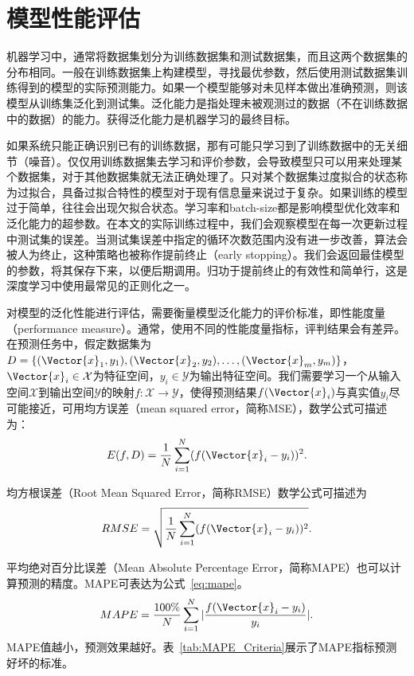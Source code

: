 \section{模型性能评估}


机器学习中，通常将数据集划分为训练数据集和测试数据集，而且这两个数据集的分布相同。一般在训练数据集上构建模型，寻找最优参数，然后使用测试数据集训练得到的模型的实际预测能力。如果一个模型能够对未见样本做出准确预测，则该模型从训练集泛化到测试集。泛化能力是指处理未被观测过的数据（不在训练数据中的数据）的能力。获得泛化能力是机器学习的最终目标。

如果系统只能正确识别已有的训练数据，那有可能只学习到了训练数据中的无关细节（噪音）。仅仅用训练数据集去学习和评价参数，会导致模型只可以用来处理某个数据集，对于其他数据集就无法正确处理了。只对某个数据集过度拟合的状态称为过拟合，具备过拟合特性的模型对于现有信息量来说过于复杂。如果训练的模型过于简单，往往会出现欠拟合状态。学习率和batch-size都是影响模型优化效率和泛化能力的超参数。在本文的实际训练过程中，我们会观察模型在每一次更新过程中测试集的误差。当测试集误差中指定的循环次数范围内没有进一步改善，算法会被人为终止，这种策略也被称作提前终止（early stopping）。我们会返回最佳模型的参数，将其保存下来，以便后期调用。归功于提前终止的有效性和简单行，这是深度学习中使用最常见的正则化之一。

对模型的泛化性能进行评估，需要衡量模型泛化能力的评价标准，即性能度量（performance measure）。通常，使用不同的性能度量指标，评判结果会有差异。在预测任务中，假定数据集为$D=\{(\Vector{x}_1,y_1),(\Vector{x}_2,y_2),\ldots,(\Vector{x}_m,y_m)\}$，$\Vector{x}_i\in\mathcal{X}$为特征空间，$y_i\in\mathcal{Y}$为输出特征空间。我们需要学习一个从输入空间$\mathcal{X}$到输出空间$\mathcal{Y}$的映射$f:\mathcal{X}\rightarrow\mathcal{Y}$，使得预测结果$f(\Vector{x}_i)$与真实值$y_i$尽可能接近，可用均方误差（mean squared error，简称MSE），数学公式可描述为：
\begin{equation}
    E(f,D)=\frac{1}{N}\sum_{i=1}^{N}(f(\Vector{x}_i-y_i))^2.
\end{equation}

均方根误差（Root Mean Squared Error，简称RMSE）数学公式可描述为
\begin{equation}
    RMSE=\sqrt{\frac{1}{N}\sum_{i=1}^{N}(f(\Vector{x}_i-y_i))^2}.
\end{equation}

平均绝对百分比误差（Mean Absolute Percentage Error，简称MAPE）也可以计算预测的精度。MAPE可表达为公式~\ref{eq:mape}。
\begin{equation} \label{eq:mape}
    MAPE=\frac{100\%}{N}\sum_{i=1}^{N}|\frac{f(\Vector{x}_i-y_i)}{y_i}|.
\end{equation}
MAPE值越小，预测效果越好。表~\ref{tab:MAPE_Criteria}展示了MAPE指标预测好坏的标准。

